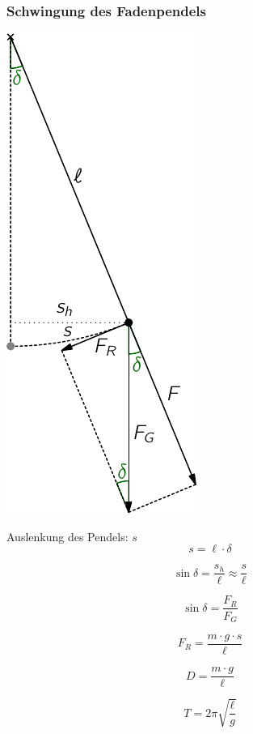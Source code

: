 \subsubsection{Schwingung des Fadenpendels}
\includegraphics[width=.35\linewidth]{fadenpendel}
\hfill
\begin{minipage}[b]{.6\linewidth}
Auslenkung des Pendels: $s$ 
\begin{equation}\label{eq:fadenpendel:auslenkung}
s = \ell\cdot\delta
\end{equation}

\begin{equation}\label{eq:fadenpendel:winkel}
\sin\delta = \frac{s_h}{\ell} \approx \frac{s}{\ell} 
\end{equation}

\begin{equation}\label{eq:fadenpendel:winkel:kraefte}
\sin\delta = \frac{F_R}{F_G}
\end{equation}

\begin{equation}\label{eq:fadenpendel:ruecktreibende:kraft}
F_R = \frac{m \cdot g \cdot s}{\ell}
\end{equation}

\begin{equation}\label{eq:fadenpendel:richtgroesse}
D = \frac{m \cdot g}{\ell}
\end{equation}

\begin{equation}\label{eq:fadenpendel:periodendauer}
T = 2 \pi\sqrt{\frac{\ell}{g}}
\end{equation}
\end{minipage}


